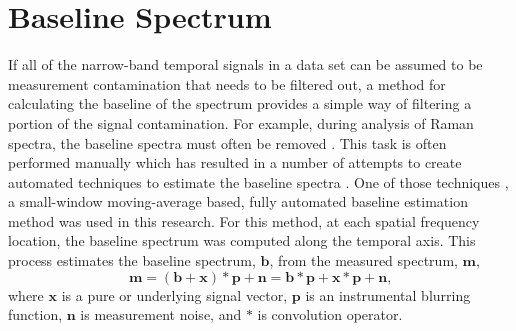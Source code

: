 \section{Baseline Spectrum}
\label{chap:06_baseline}
If all of the narrow-band temporal signals in a data set can be assumed to be measurement contamination that needs to be filtered out, a method for calculating the baseline of the spectrum provides a simple way of filtering a portion of the signal contamination.
For example, during analysis of Raman spectra, the baseline spectra must often be removed \cite{Schulze-2012-GmyAqzC7}.
This task is often performed manually which has resulted in a number of attempts to create automated techniques to estimate the baseline spectra \cite{Mosier-Boss-1995-keK3ckUN, Schulze-2005-QkUeywxD, Schulze-2012-GmyAqzC7, Zhao-2007-HAc6j8Wb}.
One of those techniques \cite{Schulze-2012-GmyAqzC7}, a small-window moving-average based, fully automated baseline estimation method was used in this research.
For this method, at each spatial frequency location, the baseline spectrum was computed along the temporal axis.
This process estimates the baseline spectrum, $\mathbf{b}$, from the measured spectrum, $\mathbf{m}$,
\begin{equation}
  \mathbf{m} = (\mathbf{b}+\mathbf{x})*\mathbf{p}+\mathbf{n} = \mathbf{b}*\mathbf{p}+\mathbf{x}*\mathbf{p}+\mathbf{n} \textrm{,}
\end{equation}
where $\mathbf{x}$ is a pure or underlying signal vector, $\mathbf{p}$ is an instrumental blurring function, $\mathbf{n}$ is measurement noise, and $*$ is convolution operator.

